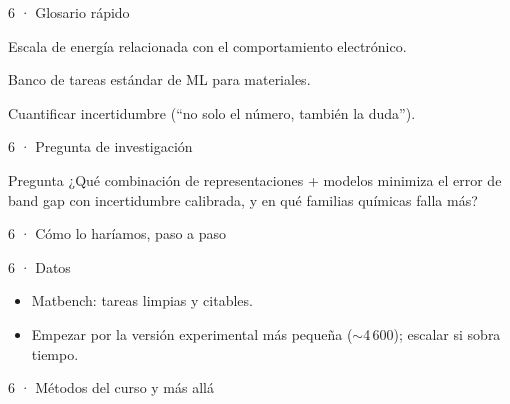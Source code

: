 \begin{frame}{6 · Glosario rápido}
  \begin{description}[font=\bfseries\scriptsize,style=nextline,leftmargin=1.8cm]
    \item[Band gap] Escala de energía relacionada con el comportamiento electrónico.
    \item[Matbench] Banco de tareas estándar de ML para materiales.
    \item[UQ] Cuantificar incertidumbre (``no solo el número, también la duda'').
  \end{description}
\end{frame}

\begin{frame}{6 · Pregunta de investigación}
  \begin{block}{Pregunta}
    ¿Qué combinación de representaciones + modelos minimiza el error de band gap con incertidumbre calibrada, y en qué familias químicas falla más?
  \end{block}
\end{frame}

\begin{frame}{6 · Cómo lo haríamos, paso a paso}
\end{frame}

\begin{frame}{6 · Datos}
  \begin{itemize}
    \item Matbench: tareas limpias y citables.
    \item Empezar por la versión experimental más pequeña ($\sim$4\,600); escalar si sobra tiempo.
  \end{itemize}
\end{frame}

\begin{frame}{6 · Métodos del curso y más allá}
\end{frame}

